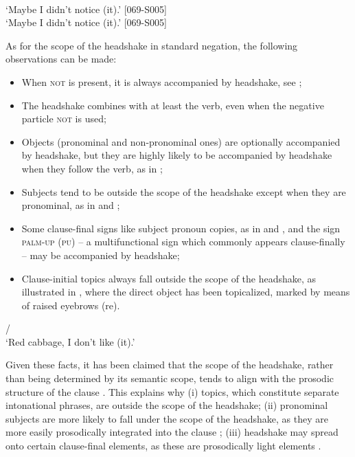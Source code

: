 \documentclass[output=paper,colorlinks,citecolor=brown]{langscibook}
\begin{document}
\ea\label{ex:ngt:neg-scope}
    \ea\label{ex:ngt:neg-scope1}   \\ `Maybe I didn’t notice (it).'  [069-S005]
    \ex\label{ex:ngt:neg-scope2}  \\ `Maybe I didn’t notice (it).'  [069-S005]
    \z
\z

As for the scope of the headshake in standard negation, the following observations can be made: 

\begin{itemize}
    \item When \textsc{not} is present, it is always accompanied by headshake, see ; 
    \item The headshake combines with at least the verb, even when the negative particle \textsc{not} is used;
    \item Objects (pronominal and non-pronominal ones) are optionally accompanied by headshake, but they are highly likely to be accompanied by headshake when they follow the verb, as in ;
    \item Subjects tend to be outside the scope of the headshake except when they are pronominal, as in  and ; 
    \item Some clause-final signs like subject pronoun copies, as in  and , and the sign \textsc{palm-up} (\textsc{pu}) -- a multifunctional sign which commonly appears clause-finally -- may be accompanied by headshake;
    \item Clause-initial topics always fall outside the scope of the headshake, as illustrated in , where the direct object has been topicalized, marked by means of raised eyebrows (re).
\end{itemize}

\ea\label{ex:ngt:topic}  /  \\ `Red cabbage, I don't like (it).'
\z

Given these facts, it has been claimed that the scope of the headshake, rather than being determined by its semantic scope, tends to align with the prosodic structure of the clause \citep{OomenEtAl2018}. This explains why (i) topics, which constitute separate intonational phrases, are outside the scope of the headshake; (ii) pronominal subjects are more likely to fall under the scope of the headshake, as they are more easily prosodically integrated into the clause \citep{OomenPfau2017}; (iii) headshake may spread onto certain clause-final elements, as these are prosodically light elements \citep{CrasbornEtAl2012}.
\end{document}
